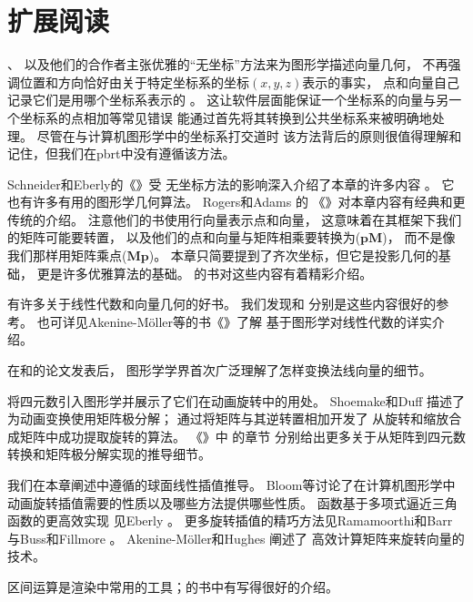 \section{扩展阅读}\label{sec:扩展阅读02}
\citeauthor{10.1007/978-3-642-61542-9_19}、\citeauthor{10.1145/282957.282969}
以及他们的合作者主张优雅的“无坐标”方法来为图形学描述向量几何，
不再强调位置和方向恰好由关于特定坐标系的坐标$(x,y,z)$表示的事实，
点和向量自己记录它们是用哪个坐标系表示的
\citep{10.1145/282957.282969,10.1007/978-3-642-61542-9_19,Mann97acoordinate}。
这让软件层面能保证一个坐标系的向量与另一个坐标系的点相加等常见错误
能通过首先将其转换到公共坐标系来被明确地处理。
尽管在与计算机图形学中的坐标系打交道时
该方法背后的原则很值得理解和记住，但我们在pbrt中没有遵循该方法。

Schneider和Eberly的《》受
无坐标方法的影响深入介绍了本章的许多内容\citep{10.5555/2821579}
。
它也有许多有用的图形学几何算法。
Rogers和Adams \parencite*{10.5555/63448}的
《》对本章内容有经典和更传统的介绍。
注意他们的书使用行向量表示点和向量，
这意味着在其框架下我们的矩阵可能要转置，
以及他们的点和向量与矩阵相乘要转换为($\bm p\bm M$)，
而不是像我们那样用矩阵乘点($\bm M\bm p$)。
本章只简要提到了齐次坐标，但它是投影几何的基础，
更是许多优雅算法的基础。
\citeauthor{10.5555/113163}的书对这些内容有着精彩介绍\citep{10.5555/113163}。

有许多关于线性代数和向量几何的好书。
我们发现\citet{lang2012introduction}和\citet{buck1956advanced}
分别是这些内容很好的参考。
也可详见Akenine-Möller等的书《》\parencite*{10.5555/2829183}了解
基于图形学对线性代数的详实介绍。

在\citet{inproceedings}和\citet{TURKOWSKI1990539}的论文发表后，
图形学学界首次广泛理解了怎样变换法线向量的细节。

\citet{10.1145/325334.325242}将四元数引入图形学并展示了它们在动画旋转中的用处。
Shoemake和Duff \parencite*{10.5555/155294.155324}描述了为动画变换使用矩阵极分解；
\citet{doi:10.1137/0907079}通过将矩阵与其逆转置相加开发了
从旋转和缩放合成矩阵中成功提取旋转的算法。
《\emph{}》中
\citeauthor{SHOEMAKE1994207}的章节\parencite*{SHOEMAKE1991351,SHOEMAKE1994207,10.5555/180895.180914}
分别给出更多关于从矩阵到四元数转换和矩阵极分解实现的推导细节。

我们在本章阐述中遵循\citet{Blow_2004}的球面线性插值推导。
Bloom等\parencite*{Bloom2003ErrorsAO}讨论了在计算机图形学中
动画旋转插值需要的性质以及哪些方法提供哪些性质。
函数基于多项式逼近三角函数的更高效实现
见Eberly \parencite*{doi:10.1080/2151237X.2011.610255}。
更多旋转插值的精巧方法见Ramamoorthi和Barr \parencite*{10.1145/258734.258870}
与Buss和Fillmore \parencite*{10.1145/502122.502124}。
Akenine-Möller和Hughes \parencite*{doi:10.1080/10867651.1999.10487509}阐述了
高效计算矩阵来旋转向量的技术。

区间运算是渲染中常用的工具；\citet{moore1966interval}的书中有写得很好的介绍。